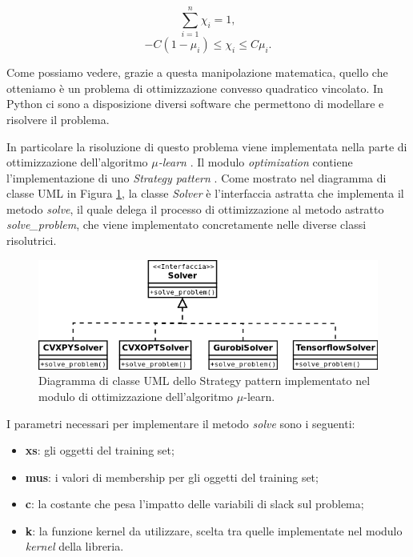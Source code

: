 \documentclass[a4paper,12pt]{report}
\begin{document}
\begin{equation}
    \displaystyle\sum_{i=1}^{n}\chi_i = 1,
    \label{eq:v1_problema_finale_2}
\end{equation}
\begin{equation}
    -C(1-\mu_i) \le \chi_i \le C\mu_i.
    \label{eq:v2_problema_finale_2}
\end{equation}

\noindent Come possiamo vedere, grazie a questa manipolazione matematica, quello che otteniamo è un problema di ottimizzazione convesso quadratico vincolato.
In Python ci sono a disposizione diversi software che permettono di modellare e risolvere il problema.

In particolare la risoluzione di questo problema viene implementata nella parte di ottimizzazione dell'algoritmo \textit{$\mu$-learn} \cite{mulearn_documentation}. Il modulo \textit{optimization} contiene l'implementazione di uno \textit{Strategy pattern} \cite{strategy_pattern}. Come mostrato nel diagramma di classe UML in Figura \ref{fig:diagramma_uml}, la classe \textit{Solver} è l'interfaccia astratta che implementa il metodo \textit{solve}, il quale delega il processo di ottimizzazione al metodo astratto \textit{solve\_problem}, che viene implementato concretamente nelle diverse classi risolutrici.

\begin{figure}
    \includegraphics[scale=0.6]{images/diagramma_uml.png}
    \centering
    \caption{Diagramma di classe UML dello Strategy pattern implementato nel modulo di ottimizzazione dell'algoritmo $\mu$-learn.}
    \label{fig:diagramma_uml}
\end{figure}

I parametri necessari per implementare il metodo \textit{solve} sono i seguenti: 
\begin{itemize}
    \item \textbf{xs}: gli oggetti del training set;
    \item \textbf{mus}: i valori di membership per gli oggetti del training set;
    \item \textbf{c}: la costante che pesa l'impatto delle variabili di slack sul problema;
    \item \textbf{k}: la funzione kernel da utilizzare, scelta tra quelle implementate nel modulo \textit{kernel} della libreria.
\end{itemize}
\end{document}
